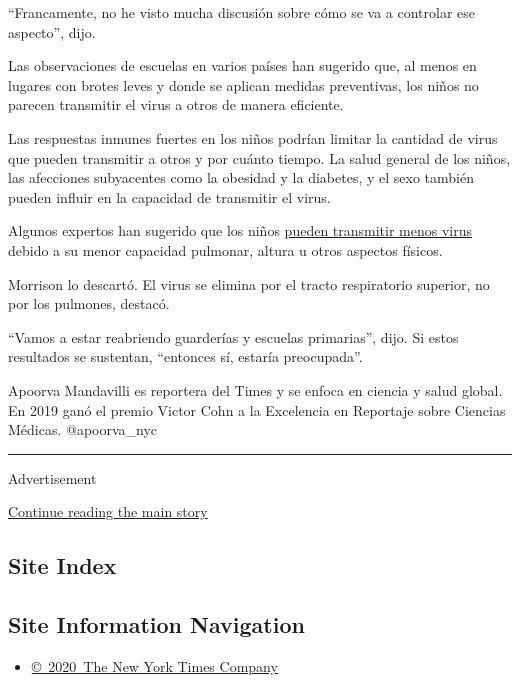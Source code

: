 ``Francamente, no he visto mucha discusión sobre cómo se va a controlar
ese aspecto'', dijo.

Las observaciones de escuelas en varios países han sugerido que, al
menos en lugares con brotes leves y donde se aplican medidas
preventivas, los niños no parecen transmitir el virus a otros de manera
eficiente.

Las respuestas inmunes fuertes en los niños podrían limitar la cantidad
de virus que pueden transmitir a otros y por cuánto tiempo. La salud
general de los niños, las afecciones subyacentes como la obesidad y la
diabetes, y el sexo también pueden influir en la capacidad de transmitir
el virus.

Algunos expertos han sugerido que los niños
\href{https://www.nytimes.com/2020/06/30/us/coronavirus-schools-reopening-guidelines-aap.html}{pueden
transmitir menos virus} debido a su menor capacidad pulmonar, altura u
otros aspectos físicos.

Morrison lo descartó. El virus se elimina por el tracto respiratorio
superior, no por los pulmones, destacó.

``Vamos a estar reabriendo guarderías y escuelas primarias'', dijo. Si
estos resultados se sustentan, ``entonces sí, estaría preocupada''.

Apoorva Mandavilli es reportera del Times y se enfoca en ciencia y salud
global. En 2019 ganó el premio Victor Cohn a la Excelencia en Reportaje
sobre Ciencias Médicas. @apoorva\_nyc

\begin{center}\rule{0.5\linewidth}{\linethickness}\end{center}

Advertisement

\protect\hyperlink{after-bottom}{Continue reading the main story}

\hypertarget{site-index}{%
\subsection{Site Index}\label{site-index}}

\hypertarget{site-information-navigation}{%
\subsection{Site Information
Navigation}\label{site-information-navigation}}

\begin{itemize}
\tightlist
\item
  \href{https://help.nytimes.com/hc/en-us/articles/115014792127-Copyright-notice}{©~2020~The
  New York Times Company}
\end{itemize}

